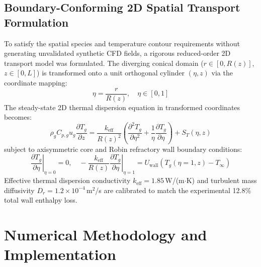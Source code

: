 \documentclass[11pt,a4paper]{article}
\begin{document}
\subsection{Boundary-Conforming 2D Spatial Transport Formulation}
To satisfy the spatial species and temperature contour requirements without generating unvalidated synthetic CFD fields, a rigorous reduced-order 2D transport model was formulated. The diverging conical domain ($r \in [0, R(z)]$, $z \in [0, L]$) is transformed onto a unit orthogonal cylinder $(\eta, z)$ via the coordinate mapping:
\begin{equation}
    \eta = \frac{r}{R(z)}, \quad \eta \in [0, 1]
\end{equation}
The steady-state 2D thermal dispersion equation in transformed coordinates becomes:
\begin{equation}
    \rho_g C_{p,g} u_g \frac{\partial T_g}{\partial z} = \frac{k_{\text{eff}}}{R(z)^2} \left(\frac{\partial^2 T_g}{\partial \eta^2} + \frac{1}{\eta}\frac{\partial T_g}{\partial \eta}\right) + S_T(\eta, z)
    \label{eq:pde_2d}
\end{equation}
subject to axisymmetric core and Robin refractory wall boundary conditions:
\begin{equation}
    \left.\frac{\partial T_g}{\partial \eta}\right|_{\eta=0} = 0, \quad -\left.\frac{k_{\text{eff}}}{R(z)} \frac{\partial T_g}{\partial \eta}\right|_{\eta=1} = U_{\text{wall}} \left(T_g(\eta=1, z) - T_\infty\right)
\end{equation}
Effective thermal dispersion conductivity $k_{\text{eff}} = 1.85$\,W/(m$\cdot$K) and turbulent mass diffusivity $D_r = 1.2 \times 10^{-4}$\,m$^2$/s are calibrated to match the experimental 12.8\% total wall enthalpy loss.

\section{Numerical Methodology and Implementation}
\end{document}
